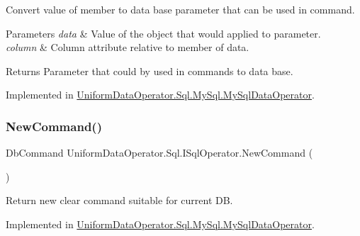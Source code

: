 Convert value of member to data base parameter that can be used in command. 


\begin{DoxyParams}{Parameters}
{\em data} & Value of the object that would applied to parameter.\\
\hline
{\em column} & Column attribute relative to member of data.\\
\hline
\end{DoxyParams}
\begin{DoxyReturn}{Returns}
Parameter that could by used in commands to data base.
\end{DoxyReturn}


Implemented in \mbox{\hyperlink{class_uniform_data_operator_1_1_sql_1_1_my_sql_1_1_my_sql_data_operator_a7d10fc1dfc16ece78ad066f596523782}{Uniform\+Data\+Operator.\+Sql.\+My\+Sql.\+My\+Sql\+Data\+Operator}}.

\mbox{\label{interface_uniform_data_operator_1_1_sql_1_1_i_sql_operator_afc0fd8b8c82515c498a6959453f331f1}} 
\subsubsection{\texorpdfstring{New\+Command()}{NewCommand()}\hspace{0.1cm}{\footnotesize\ttfamily [1/2]}}
{\footnotesize\ttfamily Db\+Command Uniform\+Data\+Operator.\+Sql.\+I\+Sql\+Operator.\+New\+Command (\begin{DoxyParamCaption}{ }\end{DoxyParamCaption})}



Return new clear command suitable for current DB. 



Implemented in \mbox{\hyperlink{class_uniform_data_operator_1_1_sql_1_1_my_sql_1_1_my_sql_data_operator_af5850bfb38f7dfcd5acd5157458ef4bd}{Uniform\+Data\+Operator.\+Sql.\+My\+Sql.\+My\+Sql\+Data\+Operator}}.

\mbox{\label{interface_uniform_data_operator_1_1_sql_1_1_i_sql_operator_a10c43a3bfb6e8c88b692488c3341f297}} 
